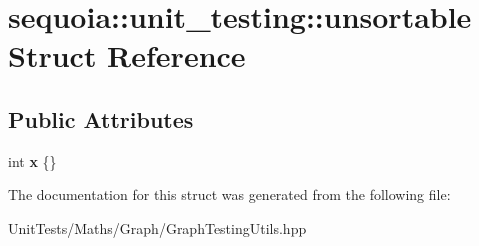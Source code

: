 \hypertarget{structsequoia_1_1unit__testing_1_1unsortable}{}\section{sequoia\+::unit\+\_\+testing\+::unsortable Struct Reference}
\label{structsequoia_1_1unit__testing_1_1unsortable}
\subsection*{Public Attributes}
\begin{DoxyCompactItemize}
\item 
\mbox{\label{structsequoia_1_1unit__testing_1_1unsortable_aa304c16b5e197621d409d25e556bf16a}} 
int {\bfseries x} \{\}
\end{DoxyCompactItemize}


The documentation for this struct was generated from the following file\+:\begin{DoxyCompactItemize}
\item 
Unit\+Tests/\+Maths/\+Graph/Graph\+Testing\+Utils.\+hpp\end{DoxyCompactItemize}
